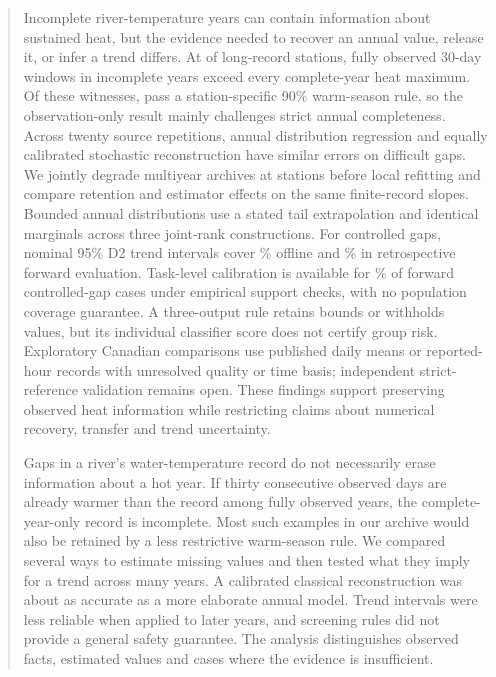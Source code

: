 \documentclass[draft,linenumbers]{agujournal2025}
\begin{document}
\begin{abstract}
Incomplete river-temperature years can contain information about sustained heat, but the evidence needed to recover an annual value, release it, or infer a trend differs. At \RRecordStations{} of \RRecordDenominator{} long-record stations, fully observed 30-day windows in \RRecordStationYears{} incomplete years exceed every complete-year heat maximum. Of these witnesses, \WAWarmAdmitted{} pass a station-specific 90\% warm-season rule, so the observation-only result mainly challenges strict annual completeness. Across twenty source repetitions, annual distribution regression and equally calibrated stochastic reconstruction have similar errors on difficult gaps. We jointly degrade multiyear archives at \WAStations{} stations before local refitting and compare retention and estimator effects on the same finite-record slopes. Bounded annual distributions use a stated tail extrapolation and identical marginals across three joint-rank constructions. For controlled gaps, nominal 95\% D2 trend intervals cover \WAOfflineCoverage\% offline and \WAForwardCoverage\% in retrospective forward evaluation. Task-level calibration is available for \WATaskForwardPercent\% of forward controlled-gap cases under empirical support checks, with no population coverage guarantee. A three-output rule retains bounds or withholds values, but its individual classifier score does not certify group risk. Exploratory Canadian comparisons use published daily means or reported-hour records with unresolved quality or time basis; independent strict-reference validation remains open. These findings support preserving observed heat information while restricting claims about numerical recovery, transfer and trend uncertainty.
\begin{plainlanguagesummary}
Gaps in a river's water-temperature record do not necessarily erase information about a hot year. If thirty consecutive observed days are already warmer than the record among fully observed years, the complete-year-only record is incomplete. Most such examples in our archive would also be retained by a less restrictive warm-season rule. We compared several ways to estimate missing values and then tested what they imply for a trend across many years. A calibrated classical reconstruction was about as accurate as a more elaborate annual model. Trend intervals were less reliable when applied to later years, and screening rules did not provide a general safety guarantee. The analysis distinguishes observed facts, estimated values and cases where the evidence is insufficient.
\end{plainlanguagesummary}
\end{abstract}
\end{document}

